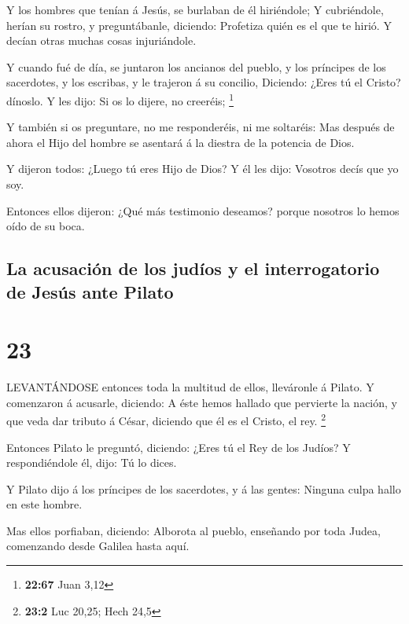  Y los hombres que tenían á Jesús, se burlaban de él
hiriéndole;  Y cubriéndole, herían su rostro, y
preguntábanle, diciendo: Profetiza quién es el que te hirió.
 Y decían otras muchas cosas injuriándole.

 Y cuando fué de día, se juntaron los ancianos del pueblo,
y los príncipes de los sacerdotes, y los escribas, y le trajeron á su
concilio,  Diciendo: ¿Eres tú el Cristo? dínoslo. Y les
dijo: Si os lo dijere, no creeréis; \footnote{\textbf{22:67} Juan 3,12}

 Y también si os preguntare, no me responderéis, ni me
soltaréis:  Mas después de ahora el Hijo del hombre se
asentará á la diestra de la potencia de Dios.

 Y dijeron todos: ¿Luego tú eres Hijo de Dios? Y él les
dijo: Vosotros decís que yo soy.

 Entonces ellos dijeron: ¿Qué más testimonio deseamos?
porque nosotros lo hemos oído de su boca.

\hypertarget{la-acusaciuxf3n-de-los-juduxedos-y-el-interrogatorio-de-jesuxfas-ante-pilato}{%
\subsection{La acusación de los judíos y el interrogatorio de Jesús ante
Pilato}\label{la-acusaciuxf3n-de-los-juduxedos-y-el-interrogatorio-de-jesuxfas-ante-pilato}}

\hypertarget{section-22}{%
\section{23}\label{section-22}}

 LEVANTÁNDOSE entonces toda la multitud de ellos, lleváronle
á Pilato.  Y comenzaron á acusarle, diciendo: A éste hemos
hallado que pervierte la nación, y que veda dar tributo á César,
diciendo que él es el Cristo, el rey. \footnote{\textbf{23:2} Luc 20,25;
  Hech 24,5}

 Entonces Pilato le preguntó, diciendo: ¿Eres tú el Rey de
los Judíos? Y respondiéndole él, dijo: Tú lo dices.

 Y Pilato dijo á los príncipes de los sacerdotes, y á las
gentes: Ninguna culpa hallo en este hombre.

 Mas ellos porfiaban, diciendo: Alborota al pueblo,
enseñando por toda Judea, comenzando desde Galilea hasta aquí.

